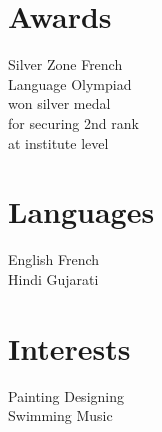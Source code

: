 \documentclass[]{deedy-resume-openfont}
\begin{document}
\begin{minipage}[t]{0.33\textwidth}

\section{Awards} 
\textbullet{} Silver Zone French \\ Language Olympiad \\ won silver medal \\ for securing 2nd rank \\ at institute level




\section{Languages}
English \textbullet{}  French \\ Hindi \textbullet{} Gujarati \\





\section{Interests}
Painting \textbullet{} Designing \\ Swimming \textbullet{} Music \\


%
%

\end{minipage} 
\hfill
\end{document}
